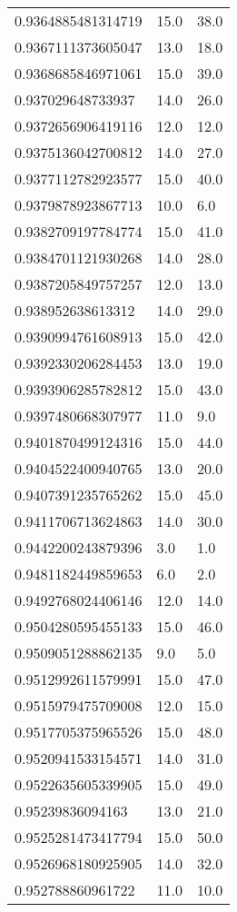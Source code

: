 \begin{center}
\begin{supertabular}[H]{p{0.30\textwidth}p{0.05\textwidth}p{0.05\textwidth}}
0.9364885481314719 & 15.0 & 38.0 \\ 
0.9367111373605047 & 13.0 & 18.0 \\ 
0.9368685846971061 & 15.0 & 39.0 \\ 
0.937029648733937 & 14.0 & 26.0 \\ 
0.9372656906419116 & 12.0 & 12.0 \\ 
0.9375136042700812 & 14.0 & 27.0 \\ 
0.9377112782923577 & 15.0 & 40.0 \\ 
0.9379878923867713 & 10.0 & 6.0 \\ 
0.9382709197784774 & 15.0 & 41.0 \\ 
0.9384701121930268 & 14.0 & 28.0 \\ 
0.9387205849757257 & 12.0 & 13.0 \\ 
0.938952638613312 & 14.0 & 29.0 \\ 
0.9390994761608913 & 15.0 & 42.0 \\ 
0.9392330206284453 & 13.0 & 19.0 \\ 
0.9393906285782812 & 15.0 & 43.0 \\ 
0.9397480668307977 & 11.0 & 9.0 \\ 
0.9401870499124316 & 15.0 & 44.0 \\ 
0.9404522400940765 & 13.0 & 20.0 \\ 
0.9407391235765262 & 15.0 & 45.0 \\ 
0.9411706713624863 & 14.0 & 30.0 \\ 
0.9442200243879396 & 3.0 & 1.0 \\ 
0.9481182449859653 & 6.0 & 2.0 \\ 
0.9492768024406146 & 12.0 & 14.0 \\ 
0.9504280595455133 & 15.0 & 46.0 \\ 
0.9509051288862135 & 9.0 & 5.0 \\ 
0.9512992611579991 & 15.0 & 47.0 \\ 
0.9515979475709008 & 12.0 & 15.0 \\ 
0.9517705375965526 & 15.0 & 48.0 \\ 
0.9520941533154571 & 14.0 & 31.0 \\ 
0.9522635605339905 & 15.0 & 49.0 \\ 
0.95239836094163 & 13.0 & 21.0 \\ 
0.9525281473417794 & 15.0 & 50.0 \\ 
0.9526968180925905 & 14.0 & 32.0 \\ 
0.952788860961722 & 11.0 & 10.0 \\ 

\end{supertabular}
\end{center}
